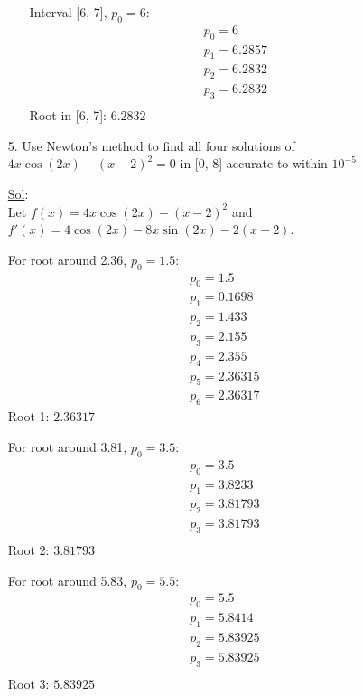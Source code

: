 \begin{enumerate}
\begin{enumerate}
        Interval [6, 7], \( p_0 = 6 \):
        \[
          \begin{array}{l}
            p_0 = 6 \\
            p_1 = 6.2857 \\
            p_2 = 6.2832 \\
            p_3 = 6.2832 \\
          \end{array}
        \]
        Root in [6, 7]: \( \boxed{6.2832} \)

    \end{enumerate}
  \item[5.] Use Newton's method to find all four solutions of \( 4x
    \cos (2x) - (x - 2)^2 = 0 \) in [0, 8] accurate to within \( 10^{-5} \)

    \underline{Sol}:\\
    Let \( f(x) = 4x \cos (2x) - (x - 2)^2 \) and \( f'(x) = 4 \cos
    (2x) - 8x \sin (2x) - 2(x - 2) \).

    For root around 2.36, \( p_0 = 1.5 \):
    \[
      \begin{array}{l}
        p_0 = 1.5 \\
        p_1 = 0.1698 \\
        p_2 = 1.433 \\
        p_3 = 2.155 \\
        p_4 = 2.355 \\
        p_5 = 2.36315 \\
        p_6 = 2.36317
      \end{array}
    \]
    Root 1: \( \boxed{2.36317} \)

    For root around 3.81, \( p_0 = 3.5 \):
    \[
      \begin{array}{l}
        p_0 = 3.5 \\
        p_1 = 3.8233 \\
        p_2 = 3.81793 \\
        p_3 = 3.81793 \\
      \end{array}
    \]
    Root 2: \( \boxed{3.81793} \)

    For root around 5.83, \( p_0 = 5.5 \):
    \[
      \begin{array}{l}
        p_0 = 5.5 \\
        p_1 = 5.8414 \\
        p_2 = 5.83925 \\
        p_3 = 5.83925 \\
      \end{array}
    \]
    Root 3: \( \boxed{5.83925} \)


\end{enumerate}
